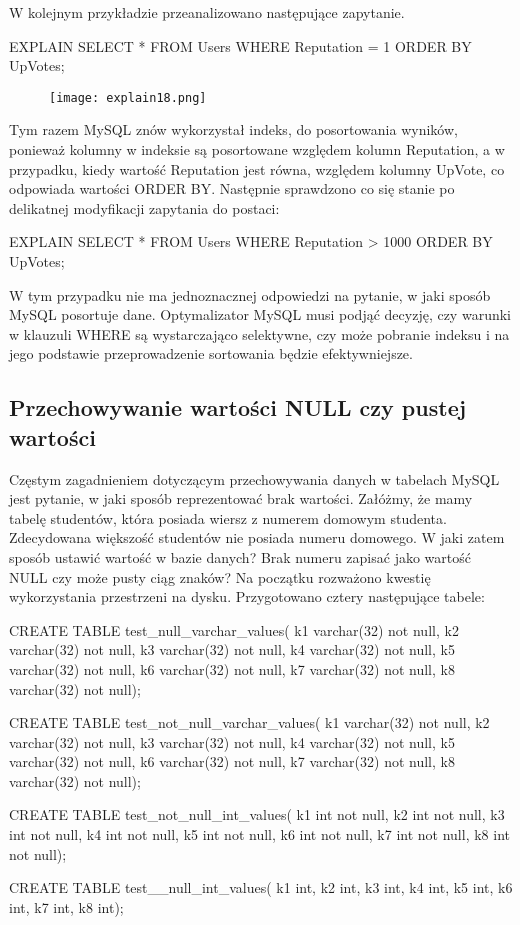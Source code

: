 W kolejnym przykładzie przeanalizowano następujące zapytanie.
\begin{spverbatim}
	EXPLAIN SELECT * FROM Users WHERE Reputation = 1 ORDER BY UpVotes;
\end{spverbatim}
\begin{figure}[H]
	\texttt{[image: explain18.png]} 
\end{figure}
Tym razem MySQL znów wykorzystał indeks, do posortowania wyników, ponieważ kolumny w indeksie są posortowane względem kolumn Reputation, a w przypadku, kiedy wartość Reputation jest równa, względem kolumny UpVote, co odpowiada wartości ORDER BY.
Następnie sprawdzono co się stanie po delikatnej modyfikacji zapytania do postaci:
\begin{spverbatim}
	EXPLAIN SELECT * FROM Users WHERE Reputation > 1000 ORDER BY UpVotes;
\end{spverbatim}

W tym przypadku nie ma jednoznacznej odpowiedzi na pytanie, w jaki sposób MySQL posortuje dane. Optymalizator MySQL musi podjąć decyzję, czy warunki w klauzuli WHERE są wystarczająco selektywne, czy może pobranie indeksu i na jego podstawie przeprowadzenie sortowania będzie efektywniejsze.

\subsection{Przechowywanie wartości NULL czy pustej wartości}
Częstym zagadnieniem dotyczącym przechowywania danych w tabelach MySQL jest pytanie, w jaki sposób reprezentować brak wartości. Załóżmy, że mamy tabelę studentów, która posiada wiersz z numerem domowym studenta. Zdecydowana większość studentów nie posiada numeru domowego. W jaki zatem sposób ustawić wartość w bazie danych? Brak numeru zapisać jako wartość NULL czy może pusty ciąg znaków? Na początku rozważono kwestię wykorzystania przestrzeni na dysku. Przygotowano cztery następujące tabele:

\begin{spverbatim}
	CREATE TABLE test_null_varchar_values(
	k1 varchar(32) not null, k2 varchar(32) not null,
	k3 varchar(32) not null, k4 varchar(32) not null,
	k5 varchar(32) not null, k6 varchar(32) not null,
	k7 varchar(32) not null, k8 varchar(32) not null);
	
	CREATE TABLE test_not_null_varchar_values(
	k1 varchar(32) not null, k2 varchar(32) not null,
	k3 varchar(32) not null, k4 varchar(32) not null,
	k5 varchar(32) not null, k6 varchar(32) not null,
	k7 varchar(32) not null, k8 varchar(32) not null);
	
	CREATE TABLE test_not_null_int_values(
	k1 int not null, k2 int not null,
	k3 int not null, k4 int not null,
	k5 int not null, k6 int not null,
	k7 int not null, k8 int not null);
	
	CREATE TABLE test__null_int_values(
	k1 int,	k2 int,	k3 int, k4 int,
	k5 int,	k6 int,	k7 int,	k8 int);
	
\end{spverbatim}

